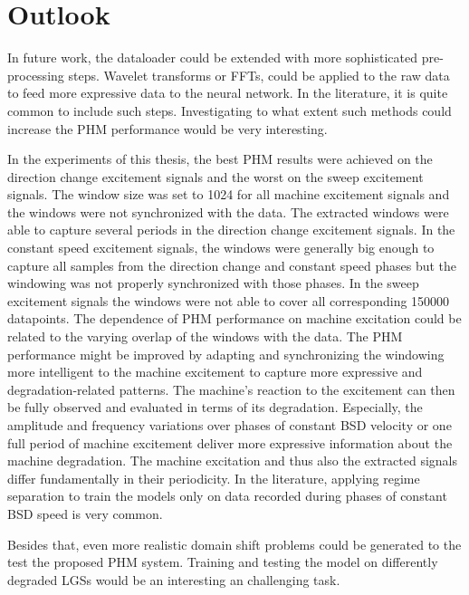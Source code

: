 \chapter{Outlook}
In future work, the dataloader could be extended with more sophisticated pre-processing steps. Wavelet transforms or FFTs, could be applied to the raw data to feed more expressive data to the neural network. In the literature, it is quite common to include such steps. Investigating to what extent such methods could increase the PHM performance would be very interesting. 

In the experiments of this thesis, the best PHM results were achieved on the direction change excitement signals and the worst on the sweep excitement signals. The window size was set to 1024 for all machine excitement signals and the windows were not synchronized with the data. The extracted windows were able to capture several periods in the direction change excitement signals. In the constant speed excitement signals, the windows were generally big enough to capture all samples from the direction change and constant speed phases but the windowing was not properly synchronized with those phases. In the sweep excitement signals the windows were not able to cover all corresponding 150000 datapoints. The dependence of PHM performance on machine excitation could be related to the varying overlap of the windows with the data. The PHM performance might be improved by adapting and synchronizing the windowing more intelligent to the machine excitement to capture more expressive and degradation-related patterns. The machine's reaction to the excitement can then be fully observed and evaluated in terms of its degradation. Especially, the amplitude and frequency variations over phases of constant BSD velocity or one full period of machine excitement deliver more expressive information about the machine degradation. The machine excitation and thus also the extracted signals differ fundamentally in their periodicity. In the literature, applying regime separation to train the models only on data recorded during phases of constant BSD speed is very common.


Besides that, even more realistic domain shift problems could be generated to the test the proposed PHM system. Training and testing the model on differently degraded LGSs would be an interesting an challenging task.

